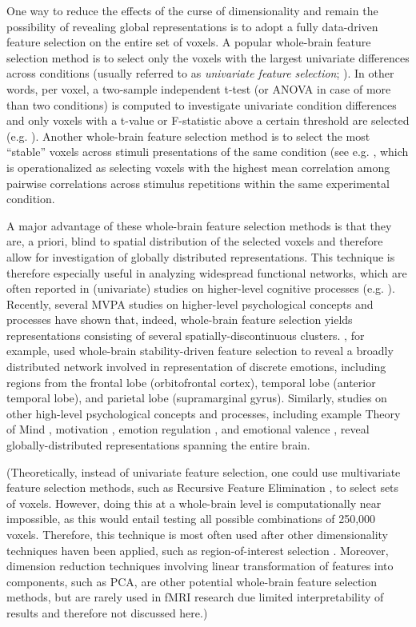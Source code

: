 \documentclass[jou,12pt,a4paper]{apa6}
\begin{document}
One way to reduce the effects of the curse of dimensionality and remain the possibility of revealing global representations is to adopt a fully data-driven feature selection on the entire set of voxels. A popular whole-brain feature selection method is to select only the voxels with the largest univariate differences across conditions (usually referred to as \emph{univariate feature selection}; ). In other words, per voxel, a two-sample independent t-test (or ANOVA in case of more than two conditions) is computed to investigate univariate condition differences and only voxels with a t-value or F-statistic above a certain threshold are selected (e.g. ). Another whole-brain feature selection method is to select the most ``stable'' voxels across stimuli presentations of the same condition (see e.g. , which is operationalized as selecting voxels with the highest mean correlation among pairwise correlations across stimulus repetitions within the same experimental condition.           

A major advantage of these whole-brain feature selection methods is that they are, a priori, blind to spatial distribution of the selected voxels and therefore allow for investigation of globally distributed representations. This technique is therefore especially useful in analyzing widespread functional networks, which are often reported in (univariate) studies on higher-level cognitive processes (e.g. ). Recently, several MVPA studies on higher-level psychological concepts and processes have shown that, indeed, whole-brain feature selection yields representations consisting of several spatially-discontinuous clusters. , for example, used whole-brain stability-driven feature selection to reveal a broadly distributed network involved in representation of discrete emotions, including regions from the frontal lobe (orbitofrontal cortex), temporal lobe (anterior temporal lobe), and parietal lobe (supramarginal gyrus). Similarly, studies on other high-level psychological concepts and processes, including example Theory of Mind \cite{corradi2014}, motivation \cite{etzel2015}, emotion regulation \cite{ochsner2002}, and emotional valence \cite{baucom2012}, reveal globally-distributed representations spanning the entire brain.

(Theoretically, instead of univariate feature selection, one could use multivariate feature selection methods, such as Recursive Feature Elimination \cite{demartino2008}, to select sets of voxels. However, doing this at a whole-brain level is computationally near impossible, as this would entail testing all possible combinations of 250,000 voxels. Therefore, this technique is most often used after other dimensionality techniques haven been applied, such as region-of-interest selection \cite{norman2006}. Moreover, dimension reduction techniques involving linear transformation of features into components, such as PCA, are other potential whole-brain feature selection methods, but are rarely used in fMRI research due limited interpretability of results and therefore not discussed here.)
\end{document}
